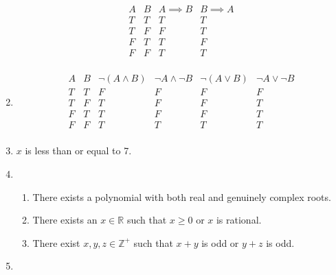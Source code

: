 \documentclass[a4paper]{article}
\begin{document}
\begin{enumerate}
\begin{displaymath}
	\begin{array}{|c|c|c|c|}
	A & B & A \implies B & B \implies A \\
	\hline
	T & T & T & T\\
	T & F & F & T\\
	F & T & T & F\\
	F & F & T & T\\
	\end{array}
	\end{displaymath}
	
\item

\begin{displaymath}
	\begin{array}{|c|c|c|c|c|c|}
	A & B & \neg (A \land B) & \neg A \land \neg B 
	& \neg (A \lor B) & \neg A \lor \neg B\\
	\hline
	T & T & F & F & F & F\\
	T & F & T & F & F & T\\
	F & T & T & F & F & T\\
	F & F & T & T & T & T\\
	\end{array}
	\end{displaymath}

\item

$x$ is less than or equal to 7.

\item

	\begin{enumerate}
	\item
	
	There exists a polynomial with both real and genuinely 			complex roots.
	
	\item 
	
	There exists an $x \in \mathbb{R}$ such that $x \geq 0$ or 	
	$x$ is rational.
	
	\item
	
	There exist $x,y,z \in \mathbb{Z}^+$ such that $x+y$ is odd 
	or $y+z$ is odd.
		
	\end{enumerate}

\item


\end{enumerate}
\end{document}
